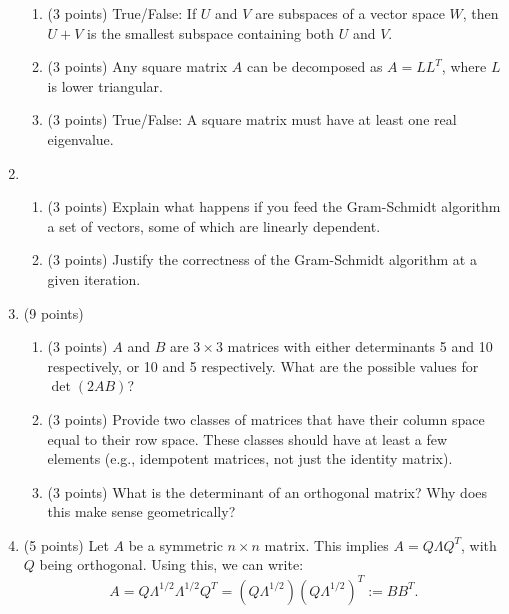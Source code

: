 \documentclass[12pt]{article}
\begin{document}
\begin{enumerate}
\begin{enumerate}
        \item (3 points) True/False: If \( U \) and \( V \) are subspaces of a vector space \( W \), then \( U + V \) is the smallest subspace containing both \( U \) and \( V \).

        \item (3 points) Any square matrix \( A \) can be decomposed as \( A = LL^T \), where \( L \) is lower triangular.



        \item (3 points) True/False: A square matrix must have at least one real eigenvalue.

    \end{enumerate}

    \item 
    \begin{enumerate}
        \item (3 points) Explain what happens if you feed the Gram-Schmidt algorithm a set of vectors, some of which are linearly dependent.
    
        \item (3 points) Justify the correctness of the Gram-Schmidt algorithm at a given iteration.
    \end{enumerate}

    
    \item (9 points)
    \begin{enumerate}
        \item (3 points) \( A \) and \( B \) are \( 3 \times 3 \) matrices with either determinants 5 and 10 respectively, or 10 and 5 respectively. What are the possible values for \( \det(2AB) \)?
    
    \item (3 points) Provide two classes of matrices that have their column space equal to their row space. These classes should have at least a few elements (e.g., idempotent matrices, not just the identity matrix).

    \item (3 points) What is the determinant of an orthogonal matrix? Why does this make sense geometrically?
    \end{enumerate}

    \item (5 points)         Let \( A \) be a symmetric \( n \times n \) matrix. This implies $A = Q \Lambda Q^T$, with $Q$ being orthogonal. Using this, we can write:
\[
A = Q \Lambda^{1/2} \Lambda^{1/2} Q^T = (Q \Lambda^{1/2})(Q \Lambda^{1/2})^T := BB^T.
\]


\end{enumerate}
\end{document}
